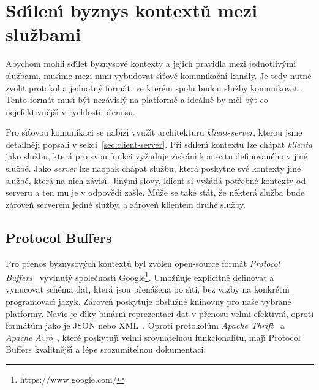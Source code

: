 \section{Sd\'{\i}len\'{\i} byznys kontextů mezi službami}

Abychom mohli sd\'{\i}let byznysové kontexty a jejich pravidla
mezi jednotliv\'ymi službami, mus\'{\i}me mezi nimi vybudovat
s\'{\i}ťové komunikačn\'{\i} kanály. Je tedy nutné zvolit protokol
a jednotn\'y formát, ve kterém spolu budou služby komunikovat.
Tento formát mus\'{\i} b\'yt nezávisl\'y na platformě a ideálně
by měl b\'yt co nejefektivnějš\'{\i} v rychlosti přenosu.

Pro s\'{\i}ťovou komunikaci se nab\'{\i}z\'{\i} využ\'{\i}t architekturu
\textit{klient-server}, kterou jsme detailněji popsali
v sekci~\ref{sec:client-server}. Při sd\'{\i}len\'{\i} kontextů
lze chápat \textit{klienta} jako službu, která pro svou funkci
vyžaduje z\'{\i}skán\'{\i} kontextu definovaného v jiné službě.
Jako \textit{server} lze naopak chápat službu, která poskytne
své kontexty jiné službě, která na nich závis\'{\i}. Jin\'ymi slovy,
klient si vyžádá potřebné kontexty od serveru a ten mu je v
odpovědi zašle. Může se také stát, že některá služba bude zároveň
serverem jedné služby, a zároveň klientem druhé služby.

\subsection{Protocol Buffers}

Pro přenos byznysov\'ych kontextů byl zvolen open-source formát
\textit{Protocol Buffers}~\cite{protobuf}\cite{varda2008protocol}
vyvinut\'y společnost\'{\i} Google\footnote{https://www.google.com/}.
Umožňuje explicitně definovat a vynucovat schéma dat,
která jsou přenášena po s\'{\i}ti, bez vazby na konkrétn\'{\i} programovac\'{\i}
jazyk. Zároveň poskytuje obslužné knihovny pro naše vybrané platformy.
Nav\'{\i}c je d\'{\i}ky binárn\'{\i} reprezentaci dat v přenosu velmi efektivn\'{\i},
oproti formátům jako je \gls{JSON} nebo \gls{XML}~\cite{maeda2012performance}.
Oproti protokolům \textit{Apache Thrift}~\cite{thrift}
a \textit{Apache Avro}~\cite{avro}, které poskytuj\'{\i}
velmi srovnatelnou funkcionalitu, maj\'{\i} Protocol Buffers
kvalitnějš\'{\i} a lépe srozumitelnou dokumentaci.



